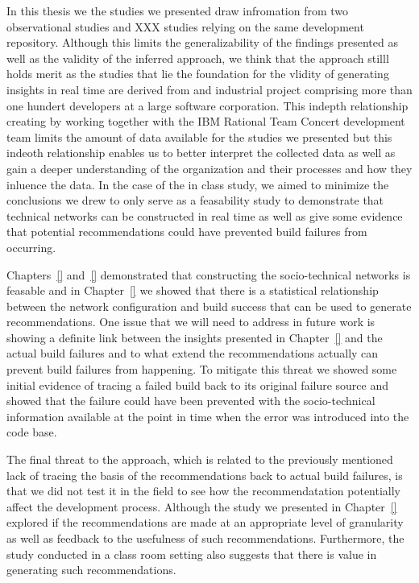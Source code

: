 In this thesis we the studies we presented draw infromation from two observational studies and XXX studies relying on the same development repository.
Although this limits the generalizability of the findings presented as well as the validity of the inferred approach, we think that the approach stilll holds merit as the studies that lie the foundation for the vlidity of generating insights in real time are derived from and industrial project comprising more than one hundert developers at a large software corporation.
This indepth relationship creating by working together with the IBM Rational Team Concert development team limits the amount of data available for the studies we presented but this indeoth relationship enables us to better interpret the collected data as well as gain a deeper understanding of the organization and their processes and how they inluence the data.
In the case of the in class study, we aimed to minimize the conclusions we drew to only serve as a feasability study to demonstrate that technical networks can be constructed in real time as well as give some evidence that potential recommendations could have prevented build failures from occurring.

Chapters~\ref{} and~\ref{} demonstrated that constructing the socio-technical networks is feasable and in Chapter~\ref{} we showed that there is a statistical relationship between the network configuration and build success that can be used to generate recommendations.
One issue that we will need to address in future work is showing a definite link between the insights presented in Chapter~\ref{} and the actual build failures and to what extend the recommendations actually can prevent build failures from happening.
To mitigate this threat we showed some initial evidence of tracing a failed build back to its original failure source and showed that the failure could have been prevented with the socio-technical information available at the point in time when the error was introduced into the code base.

The final threat to the approach, which is related to the previously mentioned lack of tracing the basis of the recommendations back to actual build failures, is that we did not test it in the field to see how the recommendatation potentially affect the development process.
Although the study we presented in Chapter~\ref{} explored if the recommendations are made at an appropriate level of granularity as well as feedback to the usefulness of such recommendations.
Furthermore, the study conducted in a class room setting also suggests that there is value in generating such recommendations.
